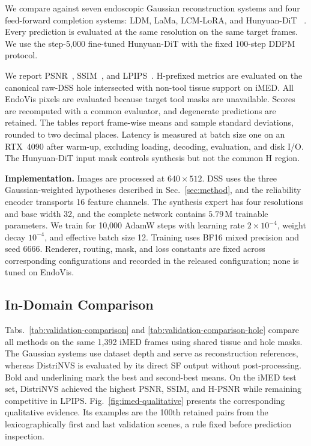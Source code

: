 \documentclass[letterpaper,10pt,conference]{ieeeconf}
\begin{document}
We compare against seven endoscopic Gaussian reconstruction systems and four
feed-forward completion systems: LDM, LaMa, LCM-LoRA, and Hunyuan-DiT
~\cite{rombach2022ldm,suvorov2022lama,luo2023lcmlora,li2024hunyuandit}. Every
prediction is evaluated at the same resolution on the same target frames. 
We use the step-5,000 fine-tuned Hunyuan-DiT with the fixed
100-step DDPM protocol.


We report PSNR~\cite{huynhthu2008psnr}, SSIM~\cite{wang2004ssim}, and LPIPS~\cite{zhang2018lpips}.
H-prefixed metrics are evaluated
on the canonical raw-DSS hole intersected with non-tool tissue support on iMED.
All EndoVis pixels are evaluated because target tool masks are unavailable.
Scores are recomputed with a common evaluator, and degenerate predictions are
retained. The tables report frame-wise means and sample standard deviations,
rounded to two decimal places. Latency is measured at batch size one on an
RTX~4090 after warm-up, excluding loading, decoding, evaluation, and disk I/O.
The Hunyuan-DiT input mask controls synthesis but not the common H region.

\noindent\textbf{Implementation.}
Images are processed at $640\times512$. DSS uses the three Gaussian-weighted
hypotheses described in Sec.~\ref{sec:method}, and the reliability encoder
transports 16 feature channels. The synthesis expert has four resolutions and
base width 32, and the complete network contains $5.79$\,M trainable
parameters. We train for 10,000 AdamW steps with learning rate
$2\times10^{-4}$, weight decay $10^{-4}$, and effective batch size 12. Training
uses BF16 mixed precision and seed 6666. Renderer, routing, mask, and loss
constants are fixed across corresponding configurations and recorded in the
released configuration; none is tuned on EndoVis.

\subsection{In-Domain Comparison}

Tabs.~\ref{tab:validation-comparison} and
\ref{tab:validation-comparison-hole} compare all methods on the same 1,392
iMED frames using shared tissue and hole masks.
The Gaussian systems use dataset depth and serve as reconstruction references,
whereas DistriNVS is evaluated by its direct SF output without post-processing.
Bold and underlining mark the best and second-best means. 
On the iMED test set, DistriNVS achieved the highest PSNR, SSIM, and
H-PSNR while remaining competitive in LPIPS. Fig.~\ref{fig:imed-qualitative}
presents the corresponding qualitative evidence. Its examples are the 100th
retained pairs from the lexicographically first and last validation scenes, a
rule fixed before prediction inspection.
\end{document}
